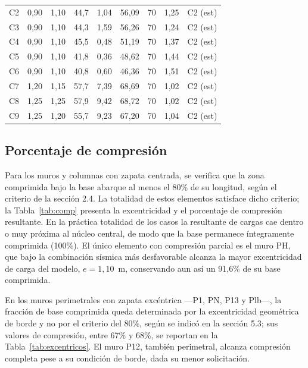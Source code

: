 \begin{table}[H]
\begin{tabular}{lcccccccc}
C2 & 0,90 & 1,10 & 44,7 & 1,04 & 56,09 & 70 & 1,25 & C2 (est) \\
C3 & 0,90 & 1,10 & 44,3 & 1,59 & 56,26 & 70 & 1,24 & C2 (est) \\
C4 & 0,90 & 1,10 & 45,5 & 0,48 & 51,19 & 70 & 1,37 & C2 (est) \\
C5 & 0,90 & 1,10 & 41,8 & 0,36 & 48,62 & 70 & 1,44 & C2 (est) \\
C6 & 0,90 & 1,10 & 40,8 & 0,60 & 46,36 & 70 & 1,51 & C2 (est) \\
C7 & 1,20 & 1,15 & 57,7 & 7,39 & 68,69 & 70 & 1,02 & C2 (est) \\
C8 & 1,25 & 1,25 & 57,9 & 9,42 & 68,72 & 70 & 1,02 & C2 (est) \\
C9 & 1,25 & 1,20 & 55,7 & 9,23 & 67,20 & 70 & 1,04 & C2 (est) \\
\hline
\end{tabular}
\end{table}

\subsection{Porcentaje de compresión}
Para los muros y columnas con zapata centrada, se verifica que la zona comprimida bajo la base abarque al menos el 80\% de su longitud, según el criterio de la sección 2.4. La totalidad de estos elementos satisface dicho criterio; la Tabla~\ref{tab:comp} presenta la excentricidad y el porcentaje de compresión resultante. En la práctica totalidad de los casos la resultante de cargas cae dentro o muy próxima al núcleo central, de modo que la base permanece íntegramente comprimida (100\%). El único elemento con compresión parcial es el muro PH, que bajo la combinación sísmica más desfavorable alcanza la mayor excentricidad de carga del modelo, $e = 1,10$~m, conservando aun así un 91,6\% de su base comprimida.

En los muros perimetrales con zapata excéntrica —P1, PN, P13 y Plb—, la fracción de base comprimida queda determinada por la excentricidad geométrica de borde y no por el criterio del 80\%, según se indicó en la sección 5.3; sus valores de compresión, entre 67\% y 68\%, se reportan en la Tabla~\ref{tab:excentricos}. El muro P12, también perimetral, alcanza compresión completa pese a su condición de borde, dada su menor solicitación.

